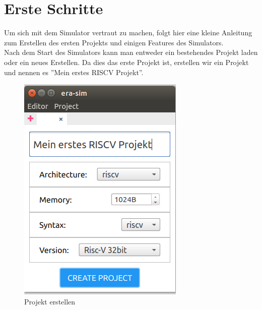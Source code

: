 
\section{Erste Schritte}


Um sich mit dem Simulator vertraut zu machen, folgt hier eine kleine Anleitung zum Erstellen des ersten Projekts und einigen Features des Simulators.\\

Nach dem Start des Simulators kann man entweder ein bestehendes Projekt laden oder ein neues Erstellen. Da dies das erste Projekt ist, erstellen wir ein Projekt und nennen es ''Mein erstes RISCV Projekt''.\\
\begin{figure}[H]
	\centering
	\includegraphics[scale=1.0]{Images/first-steps-1.png}
	\caption{Projekt erstellen}
\end{figure}

